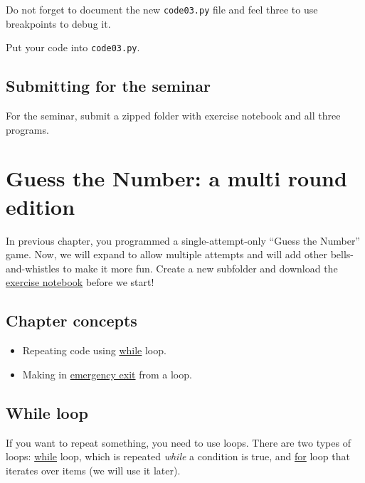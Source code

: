 \documentclass[
]{book}
\providecommand{\tightlist}{%
  \setlength{\itemsep}{0pt}\setlength{\parskip}{0pt}}
\begin{document}
Do not forget to document the new \texttt{code03.py} file and feel three to use breakpoints to debug it.

Put your code into \texttt{code03.py}.

\hypertarget{submitting-for-the-seminar}{%
\section{Submitting for the seminar}\label{submitting-for-the-seminar}}

For the seminar, submit a zipped folder with exercise notebook and all three programs.

\hypertarget{guess-the-number-multi-round}{%
\chapter{Guess the Number: a multi round edition}\label{guess-the-number-multi-round}}

In previous chapter, you programmed a single-attempt-only ``Guess the Number'' game. Now, we will expand to allow multiple attempts and will add other bells-and-whistles to make it more fun. Create a new subfolder and download the \href{notebooks/Seminar\%2003.\%20Guess\%20the\%20number\%20-\%20multi\%20round.ipynb}{exercise notebook} before we start!

\hypertarget{chapter-concepts-2}{%
\section{Chapter concepts}\label{chapter-concepts-2}}

\begin{itemize}
\tightlist
\item
  Repeating code using \protect\hyperlink{while-loop}{while} loop.
\item
  Making in \protect\hyperlink{break}{emergency exit} from a loop.
\end{itemize}

\hypertarget{while-loop}{%
\section{While loop}\label{while-loop}}

If you want to repeat something, you need to use loops. There are two types of loops: \href{https://docs.python.org/3/reference/compound_stmts.html\#the-while-statement}{while} loop, which is repeated \emph{while} a condition is true, and \href{https://docs.python.org/3/reference/compound_stmts.html\#the-for-statement}{for} loop that iterates over items (we will use it later).
\end{document}
